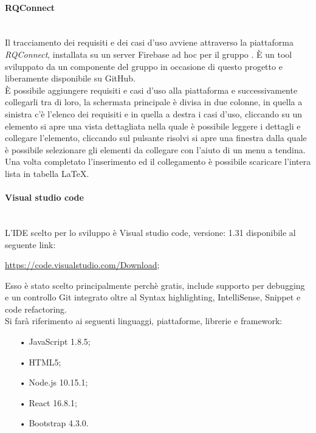 \paragraph{RQConnect}\mbox{}\\ \label{sec:Trac}
Il tracciamento dei requisiti e dei casi d’uso avviene attraverso la piattaforma 
\textit{RQConnect}, installata su un server {Firebase} ad hoc per il gruppo \gruppo.
 È  un tool sviluppato da un componente del gruppo in occasione di questo progetto e 
 liberamente disponibile su GitHub.\\ È possibile aggiungere requisiti e casi d’uso 
 alla piattaforma e successivamente collegarli tra di loro, la schermata principale è 
 divisa in due colonne, in quella a sinistra c’è l’elenco dei requisiti e in quella a 
 destra i casi d’uso, cliccando su un elemento si apre una vista dettagliata nella quale 
 è possibile leggere i dettagli e collegare l’elemento, cliccando sul pulsante risolvi si 
 apre una finestra dalla quale è possibile selezionare gli elementi da collegare con l’aiuto 
 di un menu a tendina.\\Una volta completato l’inserimento ed il collegamento è possibile scaricare 
 l’intera lista in tabella \LaTeX.

\paragraph{Visual studio code}\mbox{}\\
L'{IDE} scelto per lo sviluppo è {Visual studio code}, versione: 1.31 disponibile al seguente link:
\begin{center}
	\url{https://code.visualstudio.com/Download};
\end{center}
Esso è stato scelto principalmente perchè gratis, include supporto per debugging e un controllo Git integrato oltre al {Syntax highlighting}, {IntelliSense}, {Snippet} e {code refactoring}.\\
Si farà riferimento ai seguenti linguaggi, piattaforme, librerie e framework:
\begin{itemize}
	\item[•]{JavaScript} 1.8.5;
	\item[•]{HTML5};
	\item[•]{Node.js} 10.15.1;
	\item[•]{React} 16.8.1;
	\item[•]{Bootstrap} 4.3.0.
\end{itemize}

